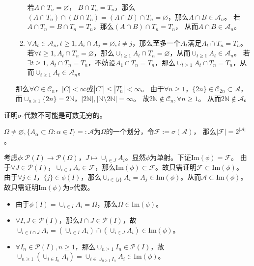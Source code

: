 \documentclass{ctexart}
\begin{document}
\begin{solution}
\begin{enumerate}
\begin{enumerate}
        若\(A \cap T_n = \varnothing \)， \(B \cap T_n =T_n \)，那么\((A \cap T_n) \cap (B \cap T_n)=(A \cap B) \cap T_n=\varnothing \)，那么\(A \cap B \in \mathcal{A}_n \)。
        若\(A \cap T_n = B \cap T_n = T_n \)，那么\((A \cap B)\cap T_n =T_n \)， 从而\(A \cap B \in \mathcal{A}_n \)。
      \item \(\forall A_t \in \mathcal{A}_n, t \geq 1, A_i \cap A_j = \varnothing , i \neq j\)，那么至多一个\(A_t \)满足\(A_t \cap T_n =T_n \)。 
        若\(\forall t \geq 1, A_t \cap T_n = \varnothing \)，那么\(\cup_{t \geq 1}A_t \cap T_n =\varnothing \)，从而\(\cup_{t \geq 1} A_t \in \mathcal{A}_n \)。
        若\(\exists t \geq 1 , A_t \cap T_n = T_n\)，不妨设\(A_1 \cap T_n =T_n \)，那么\(\cup_{t \geq 1} A_t \cap T_n =T_n \)，从而\(\cup_{t \geq 1} A_t \in \mathcal{A}_n \)。
    \end{enumerate}
    那么\(\forall C \in \mathcal{C}_n \)，\(|C |< \infty \)或\(|C^c| \leq |T_n^c| <\infty \)。
    由于\(\forall n \geq 1 \)，\(\{2n\} \in \mathcal{C}_{2n} \subset \mathcal{A} \)，而\(\cup_{n \geq 1} \{2n\} =2\mathbb{N} \)，\(|2\mathbb{N}|,|\mathbb{N} \setminus 2\mathbb{N}| = \infty \)。
    故\(2\mathbb{N} \notin \mathcal{C}_n, \forall n \geq 1  \)。 从而\(2\mathbb{N} \notin \mathcal{A} \)。
\end{enumerate}
\end{solution}

\begin{problem} 
  证明\(\sigma \)-代数不可能是可数无穷的。
\end{problem}
\begin{lemma}\label{lem:atom}
  \(\Omega \neq \varnothing,\{A_{\alpha} \subset \Omega:\alpha \in I\}=:\mathcal{A} \)为\(\Omega \)的一个划分，令\(\mathcal{F}:=\sigma(\mathcal{A}) \)，
  那么\(|\mathcal{F}|=2^{|\mathcal{A}|} \)。
\end{lemma}
\begin{solution}
  考虑\(\phi:\mathcal{P}(I) \to \mathcal{P}(\Omega) \)，\(J \mapsto \cup_{i \in J} A_i \)。显然\(\phi \)为单射。下证\(\mathrm{Im}(\phi) = \mathcal{F} \)。
  由于\(\forall J \in \mathcal{P}(I) \)，\(\cup_{i \in J}A_i \in \mathcal{F} \)，那么\(\mathrm{Im}(\phi) \subset \mathcal{F} \)。故只需证明\(\mathcal{F} \subset \mathrm{Im}(\phi) \)。
  由于\(\forall j \in I \)，\(\{j\} \in \phi(I) \)，那么\(\cup_{i \in \{j\}}A_i=A_j \in \mathrm{Im}(\phi) \)。从而\(\mathcal{A} \subset \mathrm{Im}(\phi) \)。
  故只需证明\(\mathrm{Im}(\phi) \)为\(\sigma \)代数。
  \begin{itemize}
    \item 由于\(\phi(I)=\cup_{i \in I} A_i =\Omega \)，那么\(\Omega \in \mathrm{Im}(\phi) \)。
    \item \(\forall I,J \in \mathcal{P}(I) \)，那么\(I \cap J \in \mathcal{P}(I) \)，故\(\cup_{i \in I \cap J} A_i = (\cup_{i \in I}A_i) \cap (\cup_{i \in J}A_i) \in \mathrm{Im}(\phi) \)。
    \item \(\forall I_n \in \mathcal{P}(I), n \geq 1 \)，那么\( \cup_{n \geq 1} I_n \in \mathcal{P}(I)\)，故\(\cup_{n \geq 1}(\cup_{i \in I_n} A_i )= \cup_{i \in \cup_{n \geq 1}I_n}A_i \in \mathrm{Im}(\phi)\)。
  \end{itemize}
\end{solution}
\end{document}
